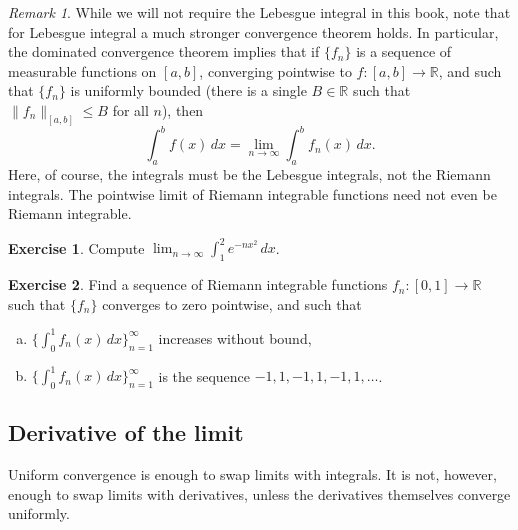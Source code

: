 \documentclass[12pt,openany]{book}
\newcommand{\snorm}[1]{\lVert {#1} \rVert}
\newcommand{\R}{{\mathbb{R}}}
\theoremstyle{plain}
\theoremstyle{remark}
\newtheorem{remark}[thm]{Remark}
\theoremstyle{definition}
\newenvironment{exbox}{%
    \def\FrameCommand{\vrule width 1pt \relax\hspace{10pt}}%
    \MakeFramed{\advance\hsize-\width\FrameRestore}%
}{%
    \endMakeFramed
}
\newenvironment{exparts}{%
    \leavevmode\begin{enumerate}[a),noitemsep,topsep=0pt,parsep=0pt,partopsep=0pt]
}{%
    \end{enumerate}
}
\theoremstyle{exercise}
\newtheorem{exercise}{Exercise}[section]
\theoremstyle{example}
\begin{document}
\begin{remark}
While we will not require the Lebesgue integral in this book, note that
for Lebesgue integral a much stronger convergence theorem holds.  In
particular, the dominated convergence theorem implies that if
$\{ f_n \}$ is a sequence of measurable functions on $[a,b]$,
converging pointwise to $f \colon [a,b] \to \R$, and such that
$\{ f_n \}$ is uniformly bounded (there is a single $B \in \R$ such that
$\snorm{f_n}_{[a,b]} \leq B$ for all $n$), then
\begin{equation*}
\int_a^b f(x) \, dx = \lim_{n\to\infty} \int_a^b f_n(x) \, dx .
\end{equation*}
Here, of course, the integrals must be the Lebesgue integrals,
not the Riemann integrals.  The pointwise limit of Riemann integrable
functions need not even be Riemann integrable.
\end{remark}

\begin{exbox}
\begin{exercise}
Compute
$\displaystyle \lim_{n\to\infty} \int_1^2 e^{-nx^2} \,dx$.
\end{exercise}

\begin{exercise}
Find a sequence of Riemann integrable functions $f_n \colon [0,1] \to \R$ such
that $\{ f_n \}$ converges to zero pointwise, and such that
\begin{exparts}
\item
$\bigl\{ \int_0^1 f_n(x)\,dx \bigr\}_{n=1}^\infty$ increases without bound,
\item
$\bigl\{ \int_0^1 f_n(x)\,dx \bigr\}_{n=1}^\infty$ is the sequence $-1,1,-1,1,-1,1, \ldots$.
\end{exparts}
\end{exercise}
\end{exbox}

\subsection{Derivative of the limit}

Uniform convergence is enough to swap limits with integrals.
It is not,
however, enough to swap limits with derivatives, unless the
derivatives themselves converge uniformly.
\end{document}
